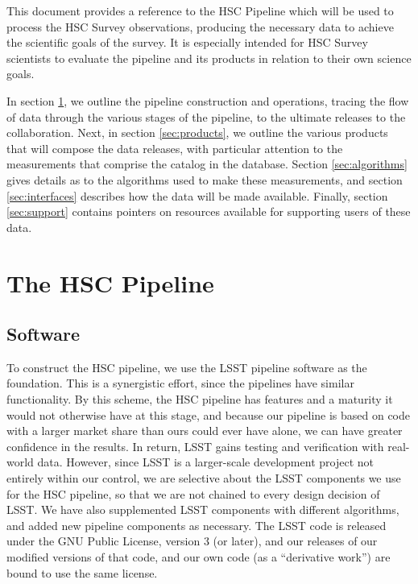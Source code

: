 \documentclass[12pt]{article}
\begin{document}
This document provides a reference to the HSC Pipeline which will be
used to process the HSC Survey observations, producing the necessary
data to achieve the scientific goals of the survey.  It is
especially intended for HSC Survey scientists to evaluate the pipeline
and its products in relation to their own science goals.

In section \ref{sec:pipeline}, we outline the pipeline construction and operations, tracing the flow of data
through the various stages of the pipeline, to the ultimate releases to the collaboration.  Next, in section
\ref{sec:products}, we outline the various products that will compose the data releases, with particular
attention to the measurements that comprise the catalog in the database.  Section \ref{sec:algorithms} gives
details as to the algorithms used to make these measurements, and section \ref{sec:interfaces} describes how
the data will be made available.  Finally, section \ref{sec:support} contains pointers on resources available
for supporting users of these data.


\section{The HSC Pipeline}
\label{sec:pipeline}
\subsection{Software}


To construct the HSC pipeline, we use the LSST pipeline software as the foundation.  This is a synergistic
effort, since the pipelines have similar functionality.  By this scheme, the HSC pipeline has features and a
maturity it would not otherwise have at this stage, and because our pipeline is based on code with a larger
market share than ours could ever have alone, we can have greater confidence in the results.  In return, LSST
gains testing and verification with real-world data.  However, since LSST is a larger-scale development
project not entirely within our control, we are selective about the LSST components we use for the HSC
pipeline, so that we are not chained to every design decision of LSST.  We have also supplemented LSST
components with different algorithms, and added new pipeline components as necessary.  The LSST code is
released under the GNU Public License, version 3 (or later), and our releases of our modified versions of that
code, and our own code (as a ``derivative work'') are bound to use the same license.
\end{document}
